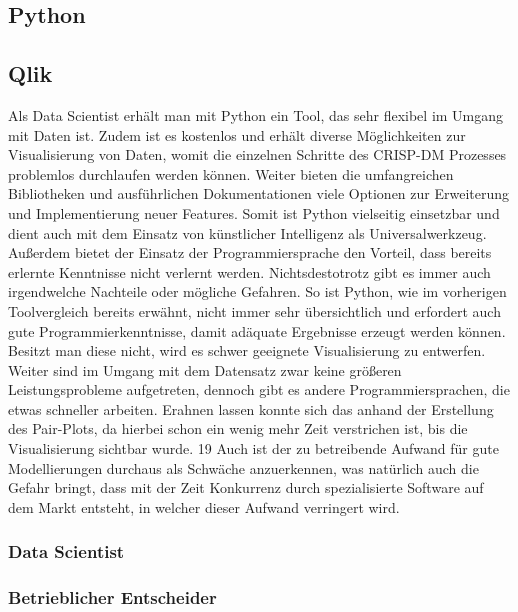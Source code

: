 \documentclass[12pt]{article}
\begin{document}
	\subsection{Python}
	
	\subsection{Qlik}
	
	Als Data Scientist erhält man mit Python ein Tool, das sehr flexibel im Umgang mit Daten
	ist. Zudem ist es kostenlos und erhält diverse Möglichkeiten zur Visualisierung von
	Daten, womit die einzelnen Schritte des CRISP-DM Prozesses problemlos durchlaufen
	werden können.
	Weiter bieten die umfangreichen Bibliotheken und ausführlichen Dokumentationen
	viele Optionen zur Erweiterung und Implementierung neuer Features. Somit ist Python
	vielseitig einsetzbar und dient auch mit dem Einsatz von künstlicher Intelligenz als
	Universalwerkzeug.
	Außerdem bietet der Einsatz der Programmiersprache den Vorteil, dass bereits erlernte
	Kenntnisse nicht verlernt werden.
	Nichtsdestotrotz gibt es immer auch irgendwelche Nachteile oder mögliche Gefahren.
	So ist Python, wie im vorherigen Toolvergleich bereits erwähnt, nicht immer sehr
	übersichtlich und erfordert auch gute Programmierkenntnisse, damit adäquate
	Ergebnisse erzeugt werden können. Besitzt man diese nicht, wird es schwer geeignete
	Visualisierung zu entwerfen.
	Weiter sind im Umgang mit dem Datensatz zwar keine größeren Leistungsprobleme
	aufgetreten, dennoch gibt es andere Programmiersprachen, die etwas schneller
	arbeiten. Erahnen lassen konnte sich das anhand der Erstellung des Pair-Plots, da
	hierbei schon ein wenig mehr Zeit verstrichen ist, bis die Visualisierung sichtbar wurde.
	19
	Auch ist der zu betreibende Aufwand für gute Modellierungen durchaus als Schwäche
	anzuerkennen, was natürlich auch die Gefahr bringt, dass mit der Zeit Konkurrenz durch
	spezialisierte Software auf dem Markt entsteht, in welcher dieser Aufwand verringert wird.
	
	\subsubsection{Data Scientist}
	
	\subsubsection{Betrieblicher Entscheider}
	
\end{document}
